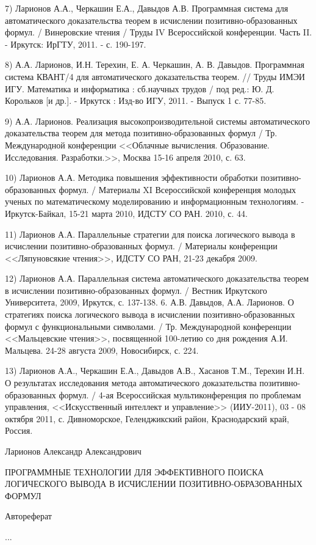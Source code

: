 \documentclass[a4paper]{report}
\begin{document}
7) Ларионов А.А., Черкашин Е.А., Давыдов А.В. Программная система для
автоматического доказательства теорем в исчислении
позитивно-образованных формул. / Винеровские чтения / Труды IV
Всероссийской конференции. Часть II. - Иркутск: ИрГТУ, 2011. - с.
190-197.

8) А.А. Ларионов, И.Н. Терехин, Е. А. Черкашин, А. В. Давыдов.
Программная система КВАНТ/4 для автоматического доказательства теорем.
// Труды ИМЭИ ИГУ. Математика и информатика : сб.научных трудов / под
ред.: Ю. Д. Корольков [и др.]. - Иркутск : Изд-во ИГУ, 2011. - Выпуск
1 с. 77-85.

9) А.А. Ларионов. Реализация высокопроизводительной системы
автоматического доказательства теорем для метода
позитивно-образованных формул / Тр. Международной конференции
<<Облачные вычисления. Образование. Исследования. Разработки.>>, Москва
15-16 апреля 2010,  с. 63.

10) Ларионов А.А. Методика повышения эффективности обработки
позитивно-образованных формул. / Материалы XI Всероссийской
конференция молодых ученых по математическому моделированию и
информационным технологиям. - Иркутск-Байкал, 15-21 марта 2010,  ИДСТУ
СО РАН.  2010, с. 44.

11) Ларионов А.А. Параллельные стратегии для поиска логического вывода
в исчислении позитивно-образованных формул. / Материалы конференции
<<Ляпуновсякие чтения>>, ИДСТУ СО РАН,  21-23 декабря 2009.

12) Ларионов А.А. Параллельная система автоматического доказательства
теорем в исчислении позитивно-образованных формул. / Вестник
Иркутского Университета, 2009, Иркутск, с. 137-138.
6. А.В. Давыдов, А.А. Ларионов. О стратегиях поиска логического вывода
в исчислении позитивно-образованных формул с функциональными
символами. / Тр. Международной конференции <<Мальцевские чтения>>,
посвященной 100-летию со дня рождения А.И. Мальцева. 24-28 августа
2009, Новосибирск, с. 224.

13) Ларионов А.А., Черкашин Е.А., Давыдов А.В., Хасанов Т.М., Терехин
И.Н. О результатах исследования метода автоматического доказательства
позитивно-образованных формул. / 4-ая Всероссийская мультиконференция
по проблемам управления, <<Искусственный интеллект и управление>>
(ИИУ-2011), 03 - 08 октября 2011, с. Дивноморское, Геленджикский
район, Краснодарский край, Россия.



\newpage
Ларионов Александр Александрович

ПРОГРАММНЫЕ ТЕХНОЛОГИИ ДЛЯ ЭФФЕКТИВНОГО ПОИСКА ЛОГИЧЕСКОГО ВЫВОДА В ИСЧИСЛЕНИИ ПОЗИТИВНО-ОБРАЗОВАННЫХ ФОРМУЛ

Автореферат

...

%
%
%
%
%

%

%
\end{document}
